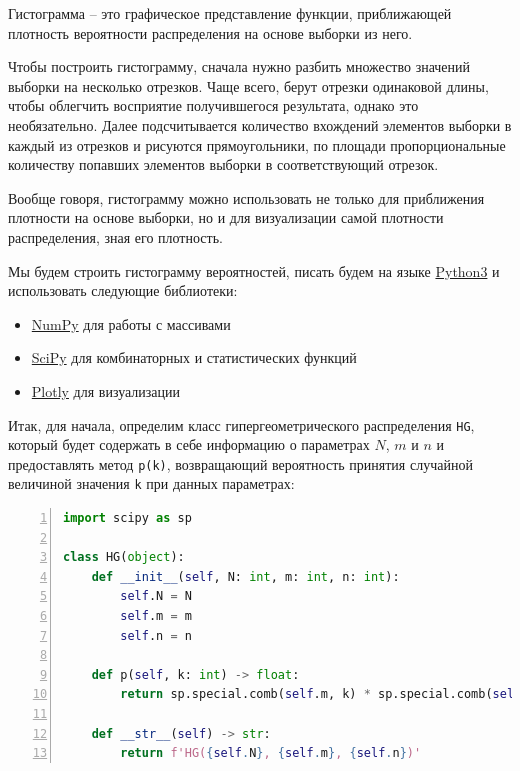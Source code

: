 \documentclass[
  russian,
  a4paper,
]{article}
\newcommand{\passthrough}[1]{#1}
\providecommand{\tightlist}{%
  \setlength{\itemsep}{0pt}\setlength{\parskip}{0pt}}
\begin{document}
Гистограмма -- это графическое представление функции, приближающей
плотность вероятности распределения на основе выборки из него.

Чтобы построить гистограмму, сначала нужно разбить множество значений
выборки на несколько отрезков. Чаще всего, берут отрезки одинаковой
длины, чтобы облегчить восприятие получившегося результата, однако это
необязательно. Далее подсчитывается количество вхождений элементов
выборки в каждый из отрезков и рисуются прямоугольники, по площади
пропорциональные количеству попавших элементов выборки в соответствующий
отрезок.

Вообще говоря, гистограмму можно использовать не только для приближения
плотности на основе выборки, но и для визуализации самой плотности
распределения, зная его плотность.

Мы будем строить гистограмму вероятностей, писать будем на языке
\href{https://www.python.org}{Python3} и использовать следующие
библиотеки:

\begin{itemize}
\tightlist
\item
  \href{https://numpy.org}{NumPy} для работы с массивами
\item
  \href{https://www.scipy.org}{SciPy} для комбинаторных и статистических
  функций
\item
  \href{https://plot.ly/python/}{Plotly} для визуализации
\end{itemize}

Итак, для начала, определим класс гипергеометрического распределения
\passthrough{\lstinline!HG!}, который будет содержать в себе информацию
о параметрах \(N\), \(m\) и \(n\) и предоставлять метод
\passthrough{\lstinline!p(k)!}, возвращающий вероятность принятия
случайной величиной значения \passthrough{\lstinline!k!} при данных
параметрах:

\begin{lstlisting}[language=Python, numbers=left, firstnumber=1]
import scipy as sp

class HG(object):
    def __init__(self, N: int, m: int, n: int):
        self.N = N
        self.m = m
        self.n = n
    
    def p(self, k: int) -> float:
        return sp.special.comb(self.m, k) * sp.special.comb(self.N-self.m, self.n-k) / sp.special.comb(self.N, self.n)
    
    def __str__(self) -> str:
        return f'HG({self.N}, {self.m}, {self.n})'
\end{lstlisting}
\end{document}
